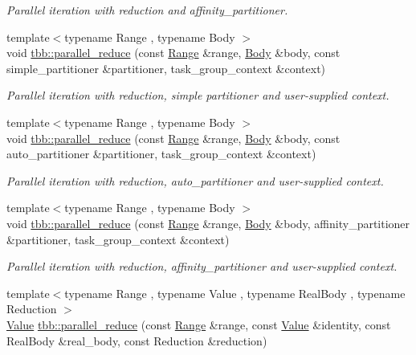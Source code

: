 \begin{DoxyCompactItemize}
\begin{DoxyCompactList}\small\item\em Parallel iteration with reduction and affinity\+\_\+partitioner. \end{DoxyCompactList}\item 
{\footnotesize template$<$typename Range , typename Body $>$ }\\void \hyperlink{group__algorithms_gac57281bea03450ccb2d098ee8c7ab697}{tbb\+::parallel\+\_\+reduce} (const \hyperlink{classtbb_1_1blocked__range}{Range} \&range, \hyperlink{classBody}{Body} \&body, const simple\+\_\+partitioner \&partitioner, task\+\_\+group\+\_\+context \&context)
\begin{DoxyCompactList}\small\item\em Parallel iteration with reduction, simple partitioner and user-\/supplied context. \end{DoxyCompactList}\item 
{\footnotesize template$<$typename Range , typename Body $>$ }\\void \hyperlink{group__algorithms_ga5f3ebf50ab7f5e53fd936817c866f7be}{tbb\+::parallel\+\_\+reduce} (const \hyperlink{classtbb_1_1blocked__range}{Range} \&range, \hyperlink{classBody}{Body} \&body, const auto\+\_\+partitioner \&partitioner, task\+\_\+group\+\_\+context \&context)
\begin{DoxyCompactList}\small\item\em Parallel iteration with reduction, auto\+\_\+partitioner and user-\/supplied context. \end{DoxyCompactList}\item 
{\footnotesize template$<$typename Range , typename Body $>$ }\\void \hyperlink{group__algorithms_ga5df3f3a9618fd35931107819cb43fce6}{tbb\+::parallel\+\_\+reduce} (const \hyperlink{classtbb_1_1blocked__range}{Range} \&range, \hyperlink{classBody}{Body} \&body, affinity\+\_\+partitioner \&partitioner, task\+\_\+group\+\_\+context \&context)
\begin{DoxyCompactList}\small\item\em Parallel iteration with reduction, affinity\+\_\+partitioner and user-\/supplied context. \end{DoxyCompactList}\item 
{\footnotesize template$<$typename Range , typename Value , typename Real\+Body , typename Reduction $>$ }\\\hyperlink{structValue}{Value} \hyperlink{group__algorithms_ga1c9b66fa25cadee9ca3bff75a6609b05}{tbb\+::parallel\+\_\+reduce} (const \hyperlink{classtbb_1_1blocked__range}{Range} \&range, const \hyperlink{structValue}{Value} \&identity, const Real\+Body \&real\+\_\+body, const Reduction \&reduction)

\end{DoxyCompactItemize}
